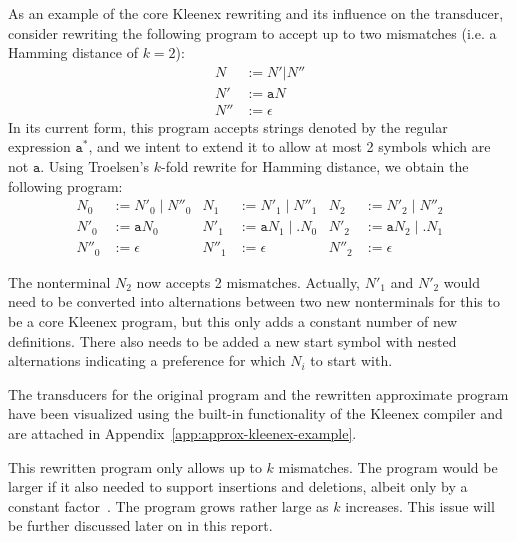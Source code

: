 As an example of the core Kleenex rewriting and its influence on the
transducer, consider rewriting the following program to accept up to two
mismatches (i.e. a Hamming distance of $k=2$):
\begin{align*}
  N   &:= N' | N''      \\
  N'  &:= \mathtt{a} N  \\
  N'' &:= \epsilon
\end{align*}
In its current form, this program accepts strings denoted by the regular
expression $\mathtt{a^*}$, and we intent to extend it to allow at most 2
symbols which are not $\mathtt{a}$. Using Troelsen's $k$-fold rewrite for
Hamming distance, we obtain the following program:
\begin{align*}
  N_0   &:= N'_0 \;|\; N''_0  &  N_1   &:= N'_1 \;|\; N''_1           & N_2   &:= N'_2 \;|\; N''_2           \\
  N'_0  &:= \mathtt{a} N_0    &  N'_1  &:= \mathtt{a} N_1 \;|\; . N_0 & N'_2  &:= \mathtt{a} N_2 \;|\; . N_1 \\
  N''_0 &:= \epsilon          &  N''_1 &:= \epsilon                   & N''_2 &:= \epsilon
\end{align*}

The nonterminal $N_2$ now accepts 2 mismatches. Actually, $N'_1$ and $N'_2$
would need to be converted into alternations between two new nonterminals for
this to be a core Kleenex program, but this only adds a constant number of new
definitions. There also needs to be added a new start symbol with nested
alternations indicating a preference for which $N_i$ to start with.

The transducers for the original program and the rewritten approximate program
have been visualized using the built-in functionality of the Kleenex compiler
and are attached in Appendix~\ref{app:approx-kleenex-example}.

This rewritten program only allows up to $k$ mismatches. The program would be
larger if it also needed to support insertions and deletions, albeit only by a
constant factor~\cite{troelsen2016approximate}. The program grows rather large
as $k$ increases. This issue will be further discussed later on in this report.

